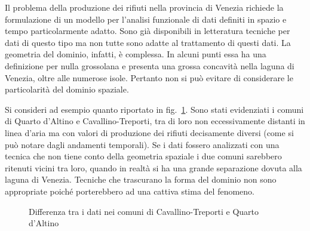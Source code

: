 \documentclass[a4paper,11pt,twoside,openright]{book}							%
\begin{document}
Il problema della produzione dei rifiuti nella provincia di Venezia richiede la formulazione di un modello per l'analisi funzionale di dati definiti in spazio e tempo particolarmente adatto. Sono già disponibili in letteratura tecniche per dati di questo tipo ma non tutte sono adatte al trattamento di questi dati. La geometria del dominio, infatti, è complessa. In alcuni punti essa ha una definizione per nulla grossolana e presenta una grossa concavità nella laguna di Venezia, oltre alle numerose isole. Pertanto non si può evitare di considerare le particolarità del dominio spaziale.

Si consideri ad esempio quanto riportato in fig.~\ref{fig:intro3}. Sono stati evidenziati i comuni di Quarto d'Altino e Cavallino-Treporti, tra di loro non eccessivamente distanti in linea d'aria ma con valori di produzione dei rifiuti decisamente diversi (come si può notare dagli andamenti temporali). Se i dati fossero analizzati con una tecnica che non tiene conto della geometria spaziale i due comuni sarebbero ritenuti vicini tra loro, quando in realtà si ha una grande separazione dovuta alla laguna di Venezia. Tecniche che trascurano la forma del dominio non sono appropriate poiché porterebbero ad una cattiva stima del fenomeno.
\newpage
\begin{figure}[t]
	\centering
	\caption{Differenza tra i dati nei comuni di Cavallino-Treporti e Quarto d'Altino}
	\label{fig:intro3}
\end{figure}
\end{document}
